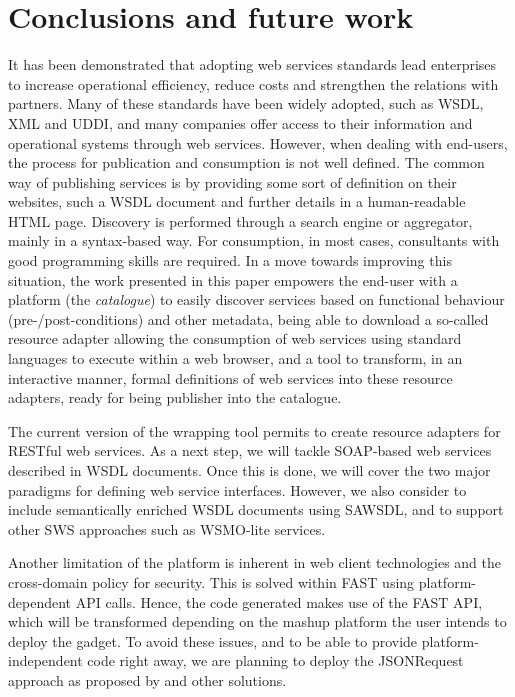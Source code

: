 
\section{Conclusions and future work}
\label{sec:conclusions}

It has been demonstrated that adopting web services standards lead enterprises to increase operational efficiency, reduce costs and strengthen the relations with partners. Many of these standards have been widely adopted, such as WSDL, XML and UDDI, and many companies offer access to their information and operational systems through web services. 
However, when dealing with end-users, the process for publication and consumption is not well defined. 
The common way of publishing services is by providing some sort of definition on their websites, such a WSDL document and further details in a human-readable HTML page. 
Discovery is performed through a search engine or aggregator, mainly in a syntax-based way. For consumption, in most cases, consultants with good programming skills are required. 
In a move towards improving this situation, the work presented in this paper empowers the end-user with a platform (the \emph{catalogue}) to easily discover services based on functional behaviour (pre-/post-conditions) and other metadata, being able to download a so-called resource adapter allowing the consumption of web services using standard languages to execute within a web browser, and a tool to transform, in an interactive manner, formal definitions of web services into these resource adapters, ready for being publisher into the catalogue.

The current version of the wrapping tool permits to create resource adapters for RESTful web services. 
As a next step, we will tackle SOAP-based web services described in WSDL documents. Once this is done, we will cover the two major paradigms for defining web service interfaces. However, we also consider to include semantically enriched WSDL documents using SAWSDL, and to support other SWS approaches such as WSMO-lite services. 

Another limitation of the platform is inherent in web client technologies and the cross-domain policy for security. This is solved within FAST using platform-dependent API calls. Hence, the code generated makes use of the FAST API, which will be transformed depending on the mashup platform the user intends to deploy the gadget. To avoid these issues, and to be able to provide platform-independent code right away, we are planning to deploy the JSONRequest approach as proposed by \cite{crockford2006} and other solutions.

